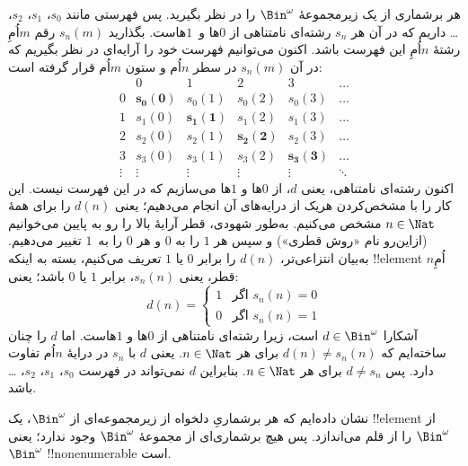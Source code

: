  {
  هر برشماری از یک زیرمجموعهٔ $\Bin^\omega$ را در نظر بگیرید. پس فهرستی
  مانند $s_{0}$، $s_{1}$، $s_{2}$، \dots{} داریم که در آن هر $s_n$ رشته‌ای
  نامتناهی از $0$ها و~$1$هاست. بگذارید $s_n(m)$ رقم $m$اُمِ رشتهٔ $n$اُمِ
  این فهرست باشد. اکنون می‌توانیم فهرست خود را آرایه‌ای در نظر بگیریم که
  در آن $s_n(m)$ در سطر $n$اُم و ستون $m$اُم قرار گرفته است:
  \[
  \begin{array}{c|c|c|c|c|c}
  & 0 & 1 & 2 & 3 & \dots \\\hline
  0 & \mathbf{s_{0}(0)} & s_{0}(1) & s_{0}(2) & s_0(3) & \dots \\\hline
  1 & s_{1}(0)& \mathbf{s_{1}(1)} & s_1(2) & s_1(3) & \dots \\\hline
  2 & s_{2}(0)& s_{2}(1) & \mathbf{s_2(2)} & s_2(3) & \dots \\\hline
  3 & s_{3}(0)& s_{3}(1) & s_3(2) & \mathbf{s_3(3)} & \dots \\\hline
  \vdots & \vdots & \vdots & \vdots & \vdots & \mathbf{\ddots}
  \end{array}
  \]
  اکنون رشته‌ای نامتناهی، یعنی $d$، از $0$ها و $1$ها می‌سازیم که در این
  فهرست نیست. این کار را با مشخص‌کردن هریک از درایه‌های آن انجام می‌دهیم؛
  یعنی $d(n)$ را برای همهٔ $n \in \Nat$ مشخص می‌کنیم. به‌طور شهودی، قطر
  آرایهٔ بالا را رو به پایین می‌خوانیم (ازاین‌رو نام «روش قطری») و سپس هر
  $1$ را به $0$ و هر $0$ را به~$1$ تغییر می‌دهیم. به‌بیان انتزاعی‌تر،
  $d(n)$ را برابر $0$ یا $1$ تعریف می‌کنیم، بسته به اینکه !!{element}
  $n$اُمِ قطر، یعنی $s_n(n)$، برابر $1$ یا $0$ باشد؛ یعنی:
  \[
  d(n) =
  \begin{cases}
  1 & \text{اگر $s_{n}(n) = 0$}\\
  0 & \text{اگر $s_{n}(n) = 1$}
  \end{cases}
  \]
  آشکارا $d \in \Bin^\omega$ است، زیرا رشته‌ای نامتناهی از $0$ها و $1$هاست.
  اما $d$ را چنان ساخته‌ایم که $d(n) \neq s_n(n)$ برای هر $n \in \Nat$.
  یعنی $d$ با $s_n$ در درایهٔ $n$اُم تفاوت دارد. پس $d \neq s_n$
  برای هر $n\in \Nat$. بنابراین $d$ نمی‌تواند در فهرست
  $s_0$، $s_1$، $s_2$،
  \dots باشد.

  نشان داده‌ایم که هر برشماریِ دلخواه از زیرمجموعه‌ای از $\Bin^\omega$،
  یک !!{element} از $\Bin^\omega$ را از قلم می‌اندازد. پس هیچ برشماری‌ای
  از مجموعهٔ $\Bin^\omega$ وجود ندارد؛ یعنی $\Bin^\omega$
  !!{nonenumerable} است.
 }

